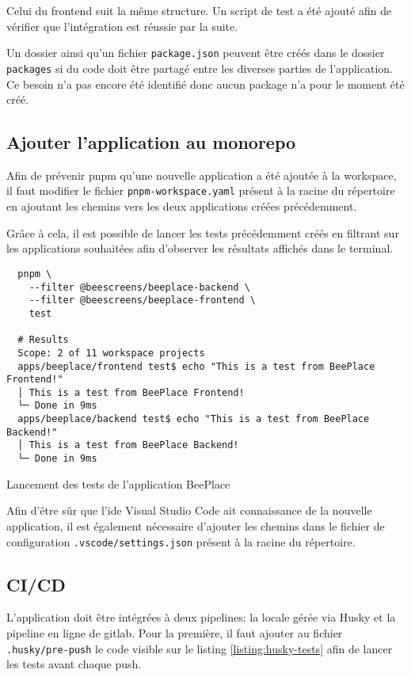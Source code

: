Celui du frontend suit la même structure. Un script de test a été ajouté afin de vérifier que l'intégration est réussie par la suite.

Un dossier ainsi qu'un fichier \texttt{package.json} peuvent être créés dans le dossier \texttt{packages} si du code doit être partagé entre les diverses parties de l'application. Ce besoin n'a pas encore été identifié donc aucun package n'a pour le moment été créé.

\subsection{Ajouter l'application au monorepo}

Afin de prévenir \gls{pnpm} qu'une nouvelle application a été ajoutée à la workspace, il faut modifier le fichier \texttt{pnpm-workspace.yaml} présent à la racine du répertoire en ajoutant les chemins vers les deux applications créées précédemment.

Grâce à cela, il est possible de lancer les tests précédemment créés en filtrant sur les applications souhaitées afin d'observer les résultats affichés dans le terminal.

\begin{listing}[H]
  \begin{verbatim}
  pnpm \
    --filter @beescreens/beeplace-backend \
    --filter @beescreens/beeplace-frontend \
    test

  # Results
  Scope: 2 of 11 workspace projects
  apps/beeplace/frontend test$ echo "This is a test from BeePlace Frontend!"
  │ This is a test from BeePlace Frontend!
  └─ Done in 9ms
  apps/beeplace/backend test$ echo "This is a test from BeePlace Backend!"
  │ This is a test from BeePlace Backend!
  └─ Done in 9ms
\end{verbatim}
  \caption{Lancement des tests de l'application BeePlace}
  \label{listing:beeplace-tests}
\end{listing}

Afin d'être sûr que l'\gls{ide} Visual Studio Code ait connaissance de la nouvelle application, il est également nécessaire d'ajouter les chemins dans le fichier de configuration \texttt{.vscode/settings.json} présent à la racine du répertoire.

\subsection{CI/CD}

L'application doit être intégrées à deux pipelines: la locale gérée via Husky et la pipeline en ligne de \gls{gitlab}. Pour la première, il faut ajouter au fichier \texttt{.husky/pre-push} le code visible sur le listing \ref{listing:husky-tests} afin de lancer les tests avant chaque push.

